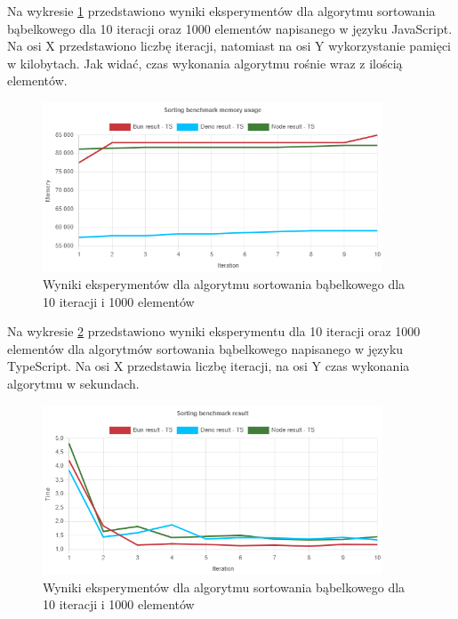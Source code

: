 Na wykresie \ref{fig:bubble_sorting_e1_memory} przedstawiono wyniki eksperymentów dla algorytmu sortowania bąbelkowego dla 10 iteracji oraz 1000 elementów napisanego w języku JavaScript. Na osi X przedstawiono liczbę iteracji, natomiast na osi Y wykorzystanie pamięci w kilobytach. Jak widać, czas wykonania algorytmu rośnie wraz z ilością elementów.
\begin{figure}[H]
  \centering
  \includegraphics[width=0.9\textwidth]{Figures/sorting/bubble/e1_memory_ts.png}
  \caption{Wyniki eksperymentów dla algorytmu sortowania bąbelkowego dla 10 iteracji i 1000 elementów}
  \label{fig:bubble_sorting_e1_memory}
\end{figure}

Na wykresie \ref{fig:bubble_sorting_e1_ts} przedstawiono wyniki eksperymentu dla 10 iteracji oraz 1000 elementów dla algorytmów sortowania bąbelkowego napisanego w języku TypeScript. Na osi X przedstawia liczbę iteracji, na osi Y czas wykonania algorytmu w sekundach.

\begin{figure}[H]
  \centering
  \includegraphics[width=0.9\textwidth]{Figures/sorting/bubble/e1_ts.png}
  \caption{Wyniki eksperymentów dla algorytmu sortowania bąbelkowego dla 10 iteracji i 1000 elementów}
  \label{fig:bubble_sorting_e1_ts}
\end{figure}

